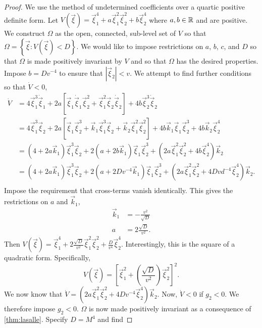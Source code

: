 \begin{proof}
    We use the method of undetermined coefficients over a quartic positive definite form. Let $V(\vec{\xi}) = \vec{\xi}_1^4 + a\vec{\xi}_1^2\vec{\xi}_2^2 + b\vec{\xi}_2^4$ where $a, b\in\mathbb{R}$ and are positive. We construct $\Omega$ as the open, connected, sub-level set of $V$ so that $\Omega=\left\{\vec{\xi} : V(\vec{\xi}) < D\right\}.$ We would like to impose restrictions on $a$, $b$, $c$, and $D$ so that $\Omega$ is made positively invariant by $V$ and so that $\Omega$ has the desired properties. Impose $b = Dv^{-4}$ to ensure that $\left|\vec{\xi}_2\right| < v$. We attempt to find further conditions so that $\dot{V}<0$,
    \begin{align*}
        \dot{V} &=  4\vec{\xi}_1^3\dot{\vec{\xi}}_1 + 2a\left[\vec{\xi}_1\dot{\vec{\xi}}_1\vec{\xi}_2^2 + \vec{\xi}_1^2\vec{\xi}_2\dot{\vec{\xi}}_2\right] + 4b\vec{\xi}_2^3\dot{\vec{\xi}}_2\\
                    &=  4\vec{\xi}_1^3\vec{\xi}_2 + 2a\left[\vec{\xi}_1\vec{\xi}_2^3 + \vec{k}_1\vec{\xi}_1^3\vec{\xi}_2 + \vec{k}_2\vec{\xi}_1^2\vec{\xi}_2^2\right] + 4b\vec{k}_1\vec{\xi}_1\vec{\xi}_2^3 + 4b\vec{k}_2\vec{\xi}_2^4\\
                    &=  \left(4+2a\vec{k}_1\right)\vec{\xi}_1^3\vec{\xi}_2 + 2\left(a + 2b\vec{k}_1\right)\vec{\xi}_1\vec{\xi}_2^3 + \left(2a\vec{\xi}_1^2\vec{\xi}_2^2 + 4b\vec{\xi}_2^4\right)\vec{k}_2\\
                    &=  \left(4+2a\vec{k}_1\right)\vec{\xi}_1^3\vec{\xi}_2 + 2\left(a + 2Dv^{-4}\vec{k}_1\right)\vec{\xi}_1\vec{\xi}_2^3 + \left(2a\vec{\xi}_1^2\vec{\xi}_2^2 + 4Dvd^{-4}\vec{\xi}_2^4\right)\vec{k}_2.\\
    \end{align*}
    Impose the requirement that cross-terms vanish identically. This gives the restrictions on $a$ and $\vec{k}_1$,
    \begin{align*}
        \vec{k}_1 &= -\frac{v^2}{\sqrt{D}}\\
        a &= 2\frac{\sqrt{D}}{v^2}.
    \end{align*}
    Then $V(\vec{\xi}) = \vec{\xi}_1^4 + 2\frac{\sqrt{D}}{v^2}\vec{\xi}_1^2\vec{\xi}_2^2 + \frac{D}{v^4}\vec{\xi}_2^4$. Interestingly, this is the square of a quadratic form. Specifically,
    $$
        V(\vec{\xi}) = \left[\vec{\xi}_1^2 + \left(\frac{\sqrt{D}}{v^2}\right)\vec{\xi}_2^2 \right]^2.
    $$ We now know that $\dot{V} = \left(2a\vec{\xi}_1^2\vec{\xi}_2^2 + 4Dv^{-4}\vec{\xi}_2^4\right)\vec{k}_2$. Now, $\dot{V} < 0$ if $g_2 < 0$. We therefore impose $g_2 < 0$. $\Omega$ is now made positively invariant as a consequence of \eqref{thm:lasalle}. Specify $D = M^4$ and find

\end{proof}
